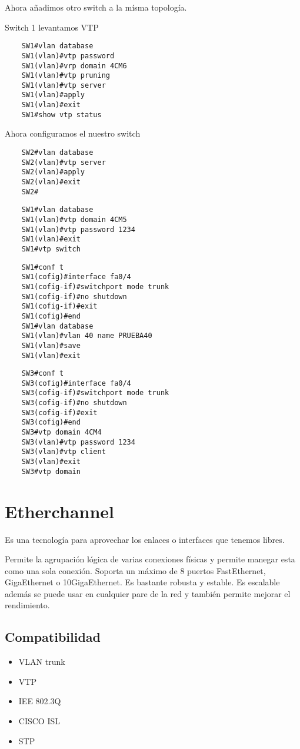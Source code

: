 Ahora añadimos otro switch a la mísma topología. 

Switch 1 levantamos VTP
\begin{lstlisting}
    SW1#vlan database 
    SW1(vlan)#vtp password
    SW1(vlan)#vrp domain 4CM6
    SW1(vlan)#vtp pruning
    SW1(vlan)#vtp server
    SW1(vlan)#apply
    SW1(vlan)#exit 
    SW1#show vtp status
\end{lstlisting}
Ahora configuramos el nuestro switch
\begin{lstlisting}
    SW2#vlan database
    SW2(vlan)#vtp server
    SW2(vlan)#apply 
    SW2(vlan)#exit 
    SW2#
\end{lstlisting}

\begin{lstlisting}
    SW1#vlan database
    SW1(vlan)#vtp domain 4CM5
    SW1(vlan)#vtp password 1234 
    SW1(vlan)#exit  
    SW1#vtp switch
\end{lstlisting}    

\begin{lstlisting}
    SW1#conf t
    SW1(cofig)#interface fa0/4
    SW1(cofig-if)#switchport mode trunk 
    SW1(cofig-if)#no shutdown  
    SW1(cofig-if)#exit 
    SW1(cofig)#end
    SW1#vlan database 
    SW1(vlan)#vlan 40 name PRUEBA40
    SW1(vlan)#save 
    SW1(vlan)#exit
\end{lstlisting}

\begin{lstlisting}
    SW3#conf t
    SW3(cofig)#interface fa0/4
    SW3(cofig-if)#switchport mode trunk 
    SW3(cofig-if)#no shutdown  
    SW3(cofig-if)#exit 
    SW3(cofig)#end
    SW3#vtp domain 4CM4
    SW3(vlan)#vtp password 1234 
    SW3(vlan)#vtp client 
    SW3(vlan)#exit 
    SW3#vtp domain  
\end{lstlisting}

\chapter{Etherchannel}
Es una tecnología para aprovechar los enlaces o interfaces que tenemos libres.

Permite la agrupación lógica de varias conexiones físicas y permite manegar esta como una sola conexión. Soporta un máximo de 8 puertos FastEthernet, GigaEthernet o 10GigaEthernet. Es bastante robusta y estable. Es escalable además se puede usar en cualquier pare de la red y también permite mejorar el rendimiento. \break 

\section{Compatibilidad}
\begin{itemize}
    \item VLAN trunk 
    \item VTP 
    \item IEE 802.3Q 
    \item CISCO ISL 
    \item STP
\end{itemize}

